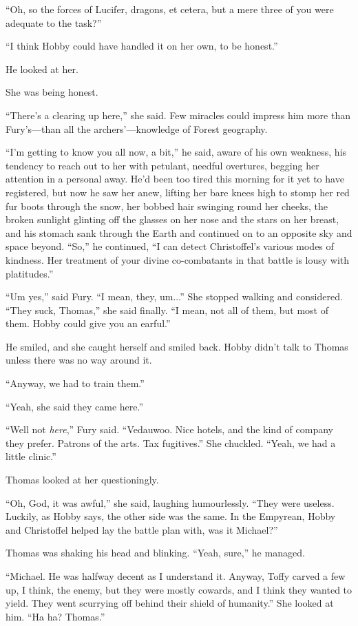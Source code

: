 \documentclass[11pt,a5paper]{article}
\begin{document}
``Oh, so the forces of Lucifer, dragons, et cetera, but a mere three of you were adequate to the task?''

``I think Hobby could have handled it on her own, to be honest.''

He looked at her.

She was being honest.

``There's a clearing up here,'' she said. Few miracles could impress him more than Fury's---than all the archers'---knowledge of Forest geography.

``I'm getting to know you all now, a bit,'' he said, aware of his own weakness, his tendency to reach out to her with petulant, needful overtures, begging her attention in a personal away. He'd been too tired this morning for it yet to have registered, but now he saw her anew, lifting her bare knees high to stomp her red fur boots through the snow, her bobbed hair swinging round her cheeks, the broken sunlight glinting off the glasses on her nose and the stars on her breast, and his stomach sank through the Earth and continued on to an opposite sky and space beyond. ``So,'' he continued, ``I can detect Christoffel's various modes of kindness. Her treatment of your divine co-combatants in that battle is lousy with platitudes.''

``Um yes,'' said Fury. ``I mean, they, um...'' She stopped walking and considered. ``They suck, Thomas,'' she said finally. ``I mean, not all of them, but most of them. Hobby could give you an earful.''

He smiled, and she caught herself and smiled back. Hobby didn't talk to Thomas unless there was no way around it.

``Anyway, we had to train them.''

``Yeah, she said they came here.''

``Well not \emph{here},'' Fury said. ``Vedauwoo. Nice hotels, and the kind of company they prefer. Patrons of the arts. Tax fugitives.'' She chuckled. ``Yeah, we had a little clinic.''

Thomas looked at her questioningly.

``Oh, God, it was awful,'' she said, laughing humourlessly. ``They were useless. Luckily, as Hobby says, the other side was the same. In the Empyrean, Hobby and Christoffel helped lay the battle plan with, was it Michael?''

Thomas was shaking his head and blinking. ``Yeah, sure,'' he managed.

``Michael. He was halfway decent as I understand it. Anyway, Toffy carved a few up, I think, the enemy, but they were mostly cowards, and I think they wanted to yield. They went scurrying off behind their shield of humanity.'' She looked at him. ``Ha ha? Thomas.''
\end{document}
